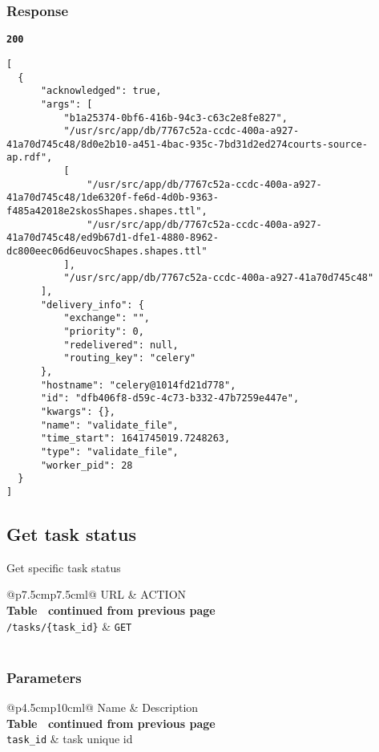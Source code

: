 \subsubsection{Response}
\textbf{\texttt{200}}
\begin{lstlisting}
[
  {
      "acknowledged": true,
      "args": [
          "b1a25374-0bf6-416b-94c3-c63c2e8fe827",
          "/usr/src/app/db/7767c52a-ccdc-400a-a927-41a70d745c48/8d0e2b10-a451-4bac-935c-7bd31d2ed274courts-source-ap.rdf",
          [
              "/usr/src/app/db/7767c52a-ccdc-400a-a927-41a70d745c48/1de6320f-fe6d-4d0b-9363-f485a42018e2skosShapes.shapes.ttl",
              "/usr/src/app/db/7767c52a-ccdc-400a-a927-41a70d745c48/ed9b67d1-dfe1-4880-8962-dc800eec06d6euvocShapes.shapes.ttl"
          ],
          "/usr/src/app/db/7767c52a-ccdc-400a-a927-41a70d745c48"
      ],
      "delivery_info": {
          "exchange": "",
          "priority": 0,
          "redelivered": null,
          "routing_key": "celery"
      },
      "hostname": "celery@1014fd21d778",
      "id": "dfb406f8-d59c-4c73-b332-47b7259e447e",
      "kwargs": {},
      "name": "validate_file",
      "time_start": 1641745019.7248263,
      "type": "validate_file",
      "worker_pid": 28
  }
]
\end{lstlisting}

\subsection{Get task status}
Get specific task status

\begin{longtable}[c]{@{}p{7.5cm}p{7.5cm}l@{}}
  \toprule
  URL                          & ACTION                       \\* \midrule
  \endfirsthead
  \multicolumn{3}{c}%
  {{\bfseries Table \thetable\ continued from previous page}} \\
  \endhead
  \bottomrule
  \endfoot
  \endlastfoot
  \texttt{/tasks/\{task\_id\}} & \texttt{GET}                 \\* \bottomrule
  \label{tab:rdf-validator-get-task}                          \\
\end{longtable}

\subsubsection{Parameters}
\begin{longtable}[c]{@{}p{4.5cm}p{10cm}l@{}}
  \toprule
  Name              & Description                             \\* \midrule
  \endfirsthead
  \multicolumn{3}{c}%
  {{\bfseries Table \thetable\ continued from previous page}} \\
  \endhead
  \bottomrule
  \endfoot
  \endlastfoot
  \texttt{task\_id} & task unique id                          \\* \bottomrule
  \label{tab:rdf-validator-get-task-parameters}               \\
\end{longtable}

